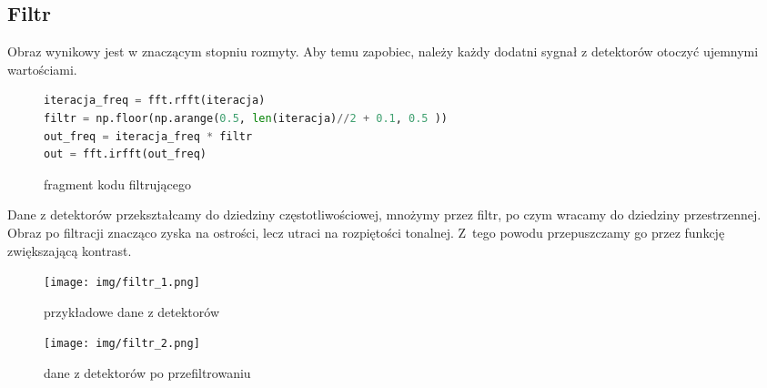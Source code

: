 \documentclass[polish,polish,a4paper]{article}
\begin{document}
				\subsection{Filtr}
					Obraz wynikowy jest w znaczącym stopniu rozmyty.
					Aby temu zapobiec, należy każdy dodatni sygnał z detektorów otoczyć ujemnymi wartościami.
					\begin{figure}[!h]
					\centering
						\begin{lstlisting}[language=Python, frame=single]
iteracja_freq = fft.rfft(iteracja)
filtr = np.floor(np.arange(0.5, len(iteracja)//2 + 0.1, 0.5 ))
out_freq = iteracja_freq * filtr
out = fft.irfft(out_freq)
						\end{lstlisting}
						\caption{fragment kodu filtrującego}
				\end{figure}
					
					Dane z detektorów przekształcamy do dziedziny częstotliwościowej,
					 mnożymy przez filtr, 
					 po czym wracamy do dziedziny przestrzennej.
					Obraz po filtracji znacząco zyska na ostrości, lecz utraci na rozpiętości tonalnej.
					Z~tego powodu przepuszczamy go przez funkcję zwiększającą kontrast.
					
					\begin{figure}[!h]
						\centering
						\begin{minipage}{0.45\linewidth}
							\texttt{[image: img/filtr\_1.png]}
							\caption{przykładowe dane z detektorów}
						\end{minipage}
						\hfill
						\begin{minipage}{0.45\linewidth}
							\texttt{[image: img/filtr\_2.png]}
							\caption{dane z detektorów po przefiltrowaniu}
						\end{minipage}
					\end{figure}
			
			
\end{document}
